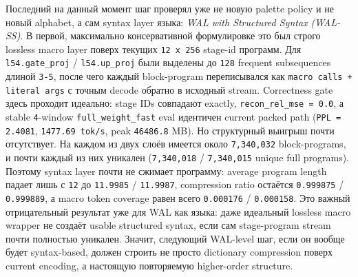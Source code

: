 \begin{itemize}[leftmargin=1.5em]
Последний на данный момент шаг проверял уже не новую palette policy и не новый
alphabet, а сам syntax layer языка: \emph{WAL with Structured Syntax (WAL-SS)}.
В первой, максимально консервативной формулировке это был строго lossless
macro layer поверх текущих \texttt{12 x 256} stage-id программ. Для
\texttt{l54.gate\_proj} / \texttt{l54.up\_proj} были выделены до
\texttt{128} frequent subsequences длиной \texttt{3-5}, после чего каждый
block-program переписывался как \texttt{macro calls + literal args} с точным
decode обратно в исходный stream. Correctness gate здесь проходит идеально:
stage IDs совпадают exactly, \texttt{recon\_rel\_mse = 0.0}, а stable
\texttt{4}-window \texttt{full\_weight\_fast} eval идентичен current packed
path (\texttt{PPL = 2.4081}, \texttt{1477.69 tok/s}, peak
\texttt{46486.8} MB). Но структурный выигрыш почти отсутствует. На каждом из
двух слоёв имеется около \texttt{7,340,032} block-programs, и почти каждый из
них уникален (\texttt{7,340,018} / \texttt{7,340,015} unique full programs).
Поэтому syntax layer почти не сжимает программу: average program length падает
лишь с \texttt{12} до \texttt{11.9985} / \texttt{11.9987}, compression ratio
остаётся \texttt{0.999875} / \texttt{0.999889}, а macro token coverage равен
всего \texttt{0.000176} / \texttt{0.000158}. Это важный отрицательный
результат уже для WAL как языка: даже идеальный lossless macro wrapper не
создаёт usable structured syntax, если сам stage-program stream почти полностью
уникален. Значит, следующий WAL-level шаг, если он вообще будет syntax-based,
должен строить не просто dictionary compression поверх current encoding, а
настоящую повторяемую higher-order structure.


\end{itemize}
